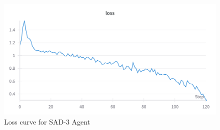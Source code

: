  \begin{figure}[h]
    \centering
    \includegraphics[width=\linewidth]{results/SAD-3-loss.png}
    \caption{
        Loss curve for SAD-3 Agent
    }
    \label{fig:sad3loss}
  \end{figure}